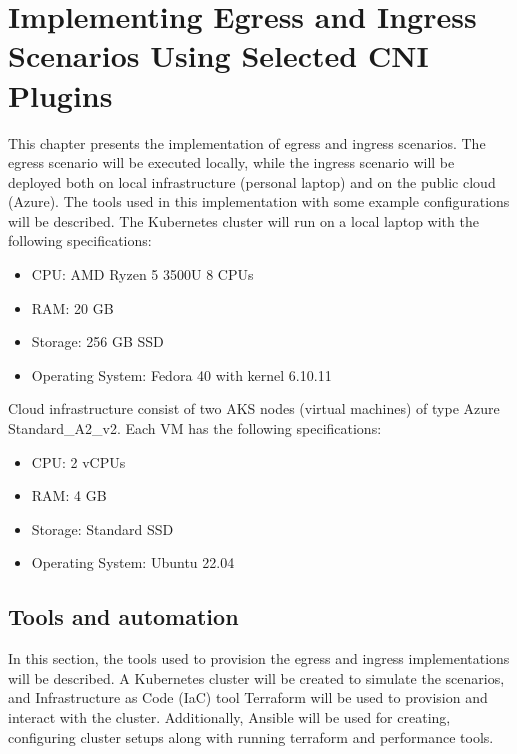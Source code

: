 \chapter{Implementing Egress and Ingress Scenarios Using Selected CNI Plugins}
\label{cha:practical_impl}

This chapter presents the implementation of egress and ingress scenarios. The egress scenario will be executed locally, while the ingress scenario will be deployed both on local infrastructure (personal laptop) and on the public cloud (Azure). The tools used in this implementation with some example configurations will be described.
The Kubernetes cluster will run on a local laptop with the following specifications:
\begin{itemize}
  \item CPU: AMD Ryzen 5 3500U 8 CPUs
  \item RAM: 20 GB
  \item Storage: 256 GB SSD
  \item Operating System: Fedora 40 with kernel 6.10.11
\end{itemize}

Cloud infrastructure consist of two AKS nodes (virtual machines) of type Azure Standard\_A2\_v2. Each VM has the following specifications:
\begin{itemize}
  \item CPU: 2 vCPUs
  \item RAM: 4 GB
  \item Storage: Standard SSD
  \item Operating System: Ubuntu 22.04
\end{itemize}






\section{Tools and automation}
\label{sec:tools}

In this section, the tools used to provision the egress and ingress implementations will be described. A Kubernetes cluster will be created to simulate the scenarios, and Infrastructure as Code (IaC) tool Terraform will be used to provision and interact with the cluster. Additionally, Ansible will be used for creating, configuring cluster setups along with running terraform and performance tools.




